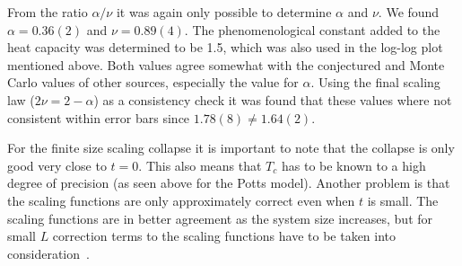 \documentclass[11pt, a4paper]{report} %
\begin{document}
From the ratio \(\alpha/\nu\) it was again only possible to determine \(\alpha\) and \(\nu\).
We found \(\alpha = 0.36(2)\) and \(\nu = 0.89(4)\).
The phenomenological constant added to the heat capacity was determined to be 1.5, which was also used in the log-log plot mentioned above.
Both values agree somewhat with the conjectured and Monte Carlo values of other sources, especially the value for \(\alpha\).
Using the final scaling law (\(2\nu = 2 -\alpha\)) as a consistency check it was found that these values where not consistent within error bars since \(1.78(8) \neq 1.64(2)\).

\vspace*{\baselineskip}

For the finite size scaling collapse it is important to note that the collapse is only good very close to \(t=0\).
This also means that \(T_c\) has to be known to a high degree of precision (as seen above for the Potts model).
Another problem is that the scaling functions are only approximately correct even when \(t\) is small.
The scaling functions are in better agreement as the system size increases, but for small \(L\) correction terms to the scaling functions have to be taken into consideration~\cite{newman:1999}.
\end{document}
